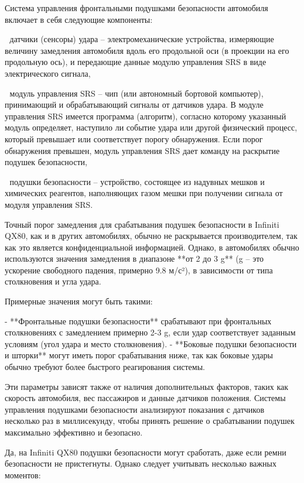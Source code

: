 Система управления фронтальными подушками безопасности автомобиля
включает в себя следующие компоненты:

 датчики (сенсоры) удара – электромеханические устройства, измеряющие
величину замедления автомобиля вдоль его продольной оси (в проекции на
его продольную ось), и передающие данные модулю управления SRS в виде
электрического сигнала,

 модуль управления SRS – чип (или автономный бортовой компьютер),
принимающий и обрабатывающий сигналы от датчиков удара. В модуле
управления SRS имеется программа (алгоритм), согласно которому
указанный модуль определяет, наступило ли событие удара или другой
физический процесс, который превышает или соответствует порогу
обнаружения. Если порог обнаружения превышен, модуль управления SRS
дает команду на раскрытие подушек безопасности,

 подушки безопасности – устройство, состоящее из надувных мешков и
химических реагентов, наполняющих газом мешки при получении сигнала
от модуля управления SRS.




  
   
   Точный порог замедления для срабатывания подушек безопасности в Infiniti QX80, как и в других автомобилях, обычно не раскрывается производителем, так как это является конфиденциальной информацией. Однако, в автомобилях обычно используются значения замедления в диапазоне **от 2 до 3 g** (g – это ускорение свободного падения, примерно 9.8 м/с²), в зависимости от типа столкновения и угла удара.
   
   Примерные значения могут быть такими:
   
   - **Фронтальные подушки безопасности** срабатывают при фронтальных столкновениях с замедлением примерно 2-3 g, если удар соответствует заданным условиям (угол удара и место столкновения).
   - **Боковые подушки безопасности и шторки** могут иметь порог срабатывания ниже, так как боковые удары обычно требуют более быстрого реагирования системы.
   
   Эти параметры зависят также от наличия дополнительных факторов, таких как скорость автомобиля, вес пассажиров и данные датчиков положения. Системы управления подушками безопасности анализируют показания с датчиков несколько раз в миллисекунду, чтобы принять решение о срабатывании подушек максимально эффективно и безопасно.
   
   
   Да, на Infiniti QX80 подушки безопасности могут сработать, даже если ремни безопасности не пристегнуты. Однако следует учитывать несколько важных моментов:
   
